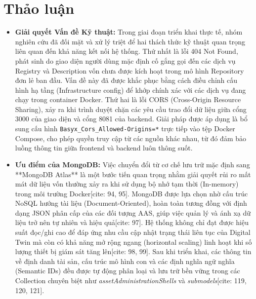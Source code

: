 \documentclass[twocolumn]{article}
\begin{document}
\section{Thảo luận}
\begin{itemize}
\item \textbf{Giải quyết Vấn đề Kỹ thuật:} Trong giai đoạn triển khai thực tế, nhóm nghiên cứu đã đối mặt và xử lý triệt để hai thách thức kỹ thuật quan trọng liên quan đến khả năng kết nối hệ thống. Thứ nhất là lỗi 404 Not Found, phát sinh do giao diện người dùng mặc định cố gắng gọi đến các dịch vụ Registry và Description vốn chưa được kích hoạt trong mô hình Repository đơn lẻ ban đầu. Vấn đề này đã được khắc phục bằng cách điều chỉnh cấu hình hạ tầng (Infrastructure config) để khớp chính xác với các dịch vụ đang chạy trong container Docker. Thứ hai là lỗi CORS (Cross-Origin Resource Sharing), xảy ra khi trình duyệt chặn các yêu cầu trao đổi dữ liệu giữa cổng 3000 của giao diện và cổng 8081 của backend. Giải pháp được áp dụng là bổ sung cấu hình \texttt{Basyx\_Cors\_Allowed-Origins=*} trực tiếp vào tệp Docker Compose, cho phép quyền truy cập từ các nguồn khác nhau, từ đó đảm bảo luồng thông tin giữa frontend và backend luôn thông suốt.

\item \textbf{Ưu điểm của MongoDB:} Việc chuyển đổi từ cơ chế lưu trữ mặc định sang **MongoDB Atlas** là một bước tiến quan trọng nhằm giải quyết rủi ro mất mát dữ liệu vốn thường xảy ra khi sử dụng bộ nhớ tạm thời (In-memory) trong môi trường Docker[cite: 94, 95]. MongoDB được lựa chọn nhờ cấu trúc NoSQL hướng tài liệu (Document-Oriented), hoàn toàn tương đồng với định dạng JSON phân cấp của các đối tượng AAS, giúp việc quản lý và ánh xạ dữ liệu trở nên tự nhiên và hiệu quả[cite: 97]. Hệ thống không chỉ đạt được hiệu suất đọc/ghi cao để đáp ứng nhu cầu cập nhật trạng thái liên tục của Digital Twin mà còn có khả năng mở rộng ngang (horizontal scaling) linh hoạt khi số lượng thiết bị giám sát tăng lên[cite: 98, 99]. Sau khi triển khai, các thông tin về định danh tài sản, cấu trúc mô hình con và các định nghĩa ngữ nghĩa (Semantic IDs) đều được tự động phân loại và lưu trữ bền vững trong các Collection chuyên biệt như \textit{assetAdministrationShells} và \textit{submodels}[cite: 119, 120, 121].


\end{itemize}
\end{document}
